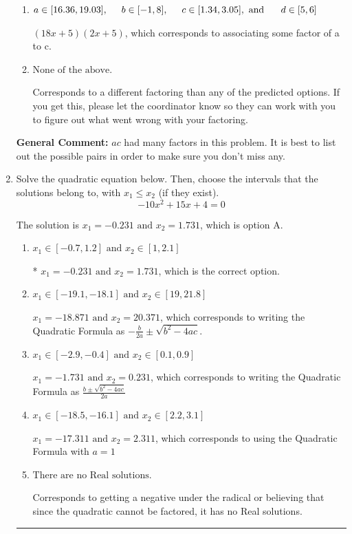 \documentclass{extbook}[14pt]
\newcommand{\litem}[1]{\item #1

\rule{\textwidth}{0.4pt}}
\begin{document}
\begin{enumerate}
{\begin{enumerate}[label=\Alph*.]
 $(x + 30)(x + 30)$, which corresponds to factoring $x^{2} +60 x + 900$.
\item \( a \in [16.36, 19.03], \hspace*{5mm} b \in [-1, 8], \hspace*{5mm} c \in [1.34, 3.05], \text{ and } \hspace*{5mm} d \in [5, 6] \)

 $(18x + 5)(2x + 5)$, which corresponds to associating some factor of a to c.
\item \( \text{None of the above.} \)

 Corresponds to a different factoring than any of the predicted options. If you get this, please let the coordinator know so they can work with you to figure out what went wrong with your factoring.
\end{enumerate}

\textbf{General Comment:} $ac$ had many factors in this problem. It is best to list out the possible pairs in order to make sure you don't miss any.
}
\litem{
Solve the quadratic equation below. Then, choose the intervals that the solutions belong to, with $x_1 \leq x_2$ (if they exist).
\[ -10x^{2} +15 x + 4 = 0 \]

The solution is \( x_1 = -0.231 \text{ and } x_2 = 1.731 \), which is option A.\begin{enumerate}[label=\Alph*.]
\item \( x_1 \in [-0.7, 1.2] \text{ and } x_2 \in [1, 2.1] \)

* $x_1 = -0.231 \text{ and } x_2 = 1.731$, which is the correct option.
\item \( x_1 \in [-19.1, -18.1] \text{ and } x_2 \in [19, 21.8] \)

 $x_1 = -18.871 \text{ and } x_2 = 20.371$, which corresponds to writing the Quadratic Formula as $-\frac{b}{2a} \pm \sqrt{b^2 - 4ac}$.
\item \( x_1 \in [-2.9, -0.4] \text{ and } x_2 \in [0.1, 0.9] \)

 $x_1 = -1.731 \text{ and } x_2 = 0.231$, which corresponds to writing the Quadratic Formula as $\frac{b \pm \sqrt{b^2 - 4ac}}{2a}$
\item \( x_1 \in [-18.5, -16.1] \text{ and } x_2 \in [2.2, 3.1] \)

 $x_1 = -17.311 \text{ and } x_2 = 2.311$, which corresponds to using the Quadratic Formula with $a=1$
\item \( \text{There are no Real solutions.} \)

Corresponds to getting a negative under the radical or believing that since the quadratic cannot be factored, it has no Real solutions.
\end{enumerate}

}
\end{enumerate}
\end{document}
